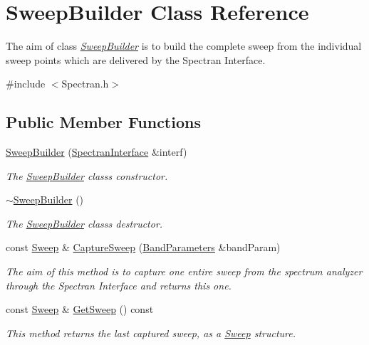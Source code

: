 \hypertarget{classSweepBuilder}{}\section{Sweep\+Builder Class Reference}
\label{classSweepBuilder}


The aim of class {\itshape \hyperlink{classSweepBuilder}{Sweep\+Builder}} is to build the complete sweep from the individual sweep points which are delivered by the Spectran Interface.  




{\ttfamily \#include $<$Spectran.\+h$>$}

\subsection*{Public Member Functions}
\begin{DoxyCompactItemize}
\item 
\hyperlink{classSweepBuilder_a41b1ecbd8c74953fe0ad5bfbf03be667}{Sweep\+Builder} (\hyperlink{classSpectranInterface}{Spectran\+Interface} \&interf)
\begin{DoxyCompactList}\small\item\em The \hyperlink{classSweepBuilder}{Sweep\+Builder} class\textquotesingle{}s constructor. \end{DoxyCompactList}\item 
\hyperlink{classSweepBuilder_aa1be2613794ac488f3bf6c0b722c48d3}{$\sim$\+Sweep\+Builder} ()
\begin{DoxyCompactList}\small\item\em The \hyperlink{classSweepBuilder}{Sweep\+Builder} class\textquotesingle{}s destructor. \end{DoxyCompactList}\item 
const \hyperlink{structSweep}{Sweep} \& \hyperlink{classSweepBuilder_ae8893395594bbf68873d33e3e7a0d192}{Capture\+Sweep} (\hyperlink{structBandParameters}{Band\+Parameters} \&band\+Param)
\begin{DoxyCompactList}\small\item\em The aim of this method is to capture one entire sweep from the spectrum analyzer through the Spectran Interface and returns this one. \end{DoxyCompactList}\item 
\mbox{\label{classSweepBuilder_a5b7e3e8d18afb651927be8ea6e7ef1e1}} 
const \hyperlink{structSweep}{Sweep} \& \hyperlink{classSweepBuilder_a5b7e3e8d18afb651927be8ea6e7ef1e1}{Get\+Sweep} () const
\begin{DoxyCompactList}\small\item\em This method returns the last captured sweep, as a {\itshape \hyperlink{structSweep}{Sweep}} structure. \end{DoxyCompactList}\end{DoxyCompactItemize}


